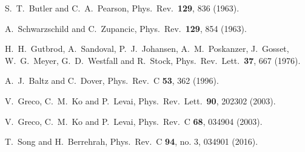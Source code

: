 \documentclass[twocolumn,aps,superscriptaddress,showpacs,nofootinbib,floatfix]{revtex4}
\begin{document}
\begin{thebibliography}{99}
  S.~T.~Butler and C.~A.~Pearson,
  Phys.\ Rev.\  {\bf 129}, 836 (1963).

  A.~Schwarzschild and C.~Zupancic,
  Phys.\ Rev.\  {\bf 129}, 854 (1963).

  H.~H.~Gutbrod, A.~Sandoval, P.~J.~Johansen, A.~M.~Poskanzer, J.~Gosset, W.~G.~Meyer, G.~D.~Westfall and R.~Stock,
  Phys.\ Rev.\ Lett.\  {\bf 37}, 667 (1976).

  A.~J.~Baltz and C.~Dover,
  Phys.\ Rev.\ C {\bf 53}, 362 (1996).

  V.~Greco, C.~M.~Ko and P.~Levai,
  Phys.\ Rev.\ Lett.\  {\bf 90}, 202302 (2003).

  V.~Greco, C.~M.~Ko and P.~Levai,
  Phys.\ Rev.\ C {\bf 68}, 034904 (2003).

  T.~Song and H.~Berrehrah,
  Phys.\ Rev.\ C {\bf 94}, no. 3, 034901 (2016).


\end{thebibliography}
\end{document}
